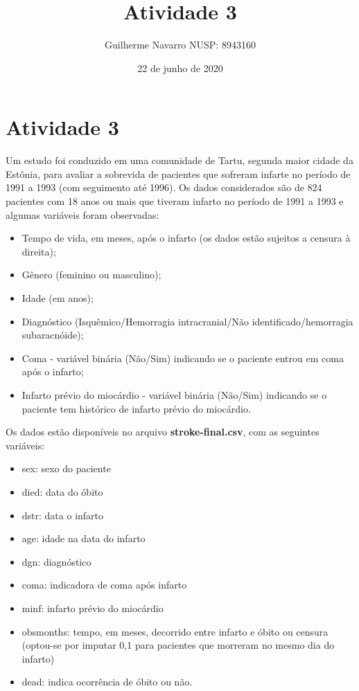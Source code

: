 \documentclass[]{article}
\title{Atividade 3}
\author{Guilherme Navarro NUSP: 8943160}
\date{22 de junho de 2020}
\providecommand{\tightlist}{%
  \setlength{\itemsep}{0pt}\setlength{\parskip}{0pt}}
\begin{document}
\maketitle

\section{Atividade 3}\label{atividade-3}

Um estudo foi conduzido em uma comunidade de Tartu, segunda maior cidade
da Estônia, para avaliar a sobrevida de pacientes que sofreram infarte
no período de 1991 a 1993 (com seguimento até 1996). Os dados
considerados são de 824 pacientes com 18 anos ou mais que tiveram
infarto no período de 1991 a 1993 e algumas variáveis foram observadas:

\begin{itemize}
\tightlist
\item
  Tempo de vida, em meses, após o infarto (os dados estão sujeitos a
  censura à direita);
\item
  Gênero (feminino ou masculino);
\item
  Idade (em anos);
\item
  Diagnóstico (Isquêmico/Hemorragia intracranial/Não
  identificado/hemorragia subaracnóide);
\item
  Coma - variável binária (Não/Sim) indicando se o paciente entrou em
  coma após o infarto;
\item
  Infarto prévio do miocárdio - variável binária (Não/Sim) indicando se
  o paciente tem histórico de infarto prévio do miocárdio.
\end{itemize}

Os dados estão disponíveis no arquivo \textbf{stroke-final.csv}, com as
seguintes variáveis:

\begin{itemize}
\tightlist
\item
  sex: sexo do paciente
\item
  died: data do óbito
\item
  dstr: data o infarto
\item
  age: idade na data do infarto
\item
  dgn: diagnóstico
\item
  coma: indicadora de coma após infarto
\item
  minf: infarto prévio do miocárdio
\item
  obsmonths: tempo, em meses, decorrido entre infarto e óbito ou censura
  (optou-se por imputar 0,1 para pacientes que morreram no mesmo dia do
  infarto)
\item
  dead: indica ocorrência de óbito ou não.
\end{itemize}
\end{document}
